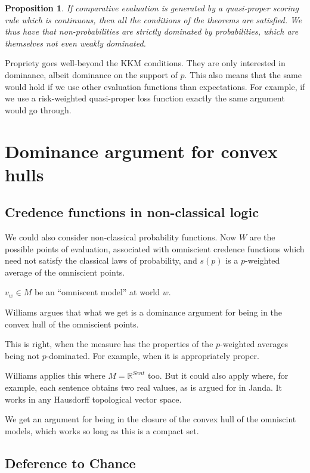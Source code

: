 \documentclass[11pt]{article}
\newtheorem{proposition}[theorem]{Proposition}
\theoremstyle{definition}
\theoremstyle{remark}
\newcommand{\R}{\mathbb R}
\begin{document}
\begin{proposition}
	If comparative evaluation is generated by a quasi-proper scoring rule which is continuous, then all the conditions of the theorems are satisfied. We thus have that non-probabilities are strictly dominated by probabilities, which are themselves not even weakly dominated. 
\end{proposition}

Propriety goes well-beyond the KKM conditions. They are only interested in dominance, albeit dominance on the support of $p$. This also means that the same would hold if we use other evaluation functions than expectations. For example, if we use a risk-weighted quasi-proper loss function exactly the same argument would go through. 



\section{Dominance argument for convex hulls}
\subsection{Credence functions in non-classical logic}

We could also consider non-classical probability functions. Now $W$ are the possible points of evaluation, associated with omniscient credence functions which need not satisfy the classical laws of probability, and $s(p)$ is a $p$-weighted average of the omniscient points. 

$v_w\in M$ be an ``omniscent model'' at world $w$. 

Williams argues that what we get is a dominance argument for being in the convex hull of the omniscient points. 

This is right, when the measure has the properties of the $p$-weighted averages being not $p$-dominated. For example, when it is appropriately proper. 

Williams applies this where $M=\R^{Sent}$ too. 
But it could also apply where, for example, each sentence obtains two real values, as is argued for in Janda. It works in any Hausdorff topological vector space. 

We get an argument for being in the closure of the convex hull of the omniscint models, which works so long as this is a compact set. 

\subsection{Deference to Chance}
\end{document}
